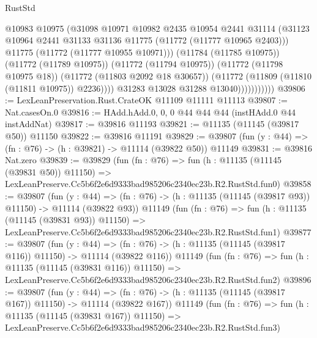 \begin{lexlean}{RustStd}
\begin{coremodule}
                              @10983
                              @10975
                              (@31098
                                @10971
                                @10982
                                @2435
                                @10954
                                @2441
                                @31114
                                (@31123
                                  @10964
                                  @2441
                                  @31133
                                  @31136
                                  @11775
                                  (@11772 (@11777 @10965 @2403)))
                                @11775
                                (@11772 (@11777 @10955 @10971)))
                              (@11784 (@11785 @10975))
                              (@11772 (@11789 @10975))
                              (@11772 (@11794 @10975))
                              (@11772 (@11798 @10975 @18))
                              (@11772 (@11803 @2092 @18 @30657))
                              (@11772 (@11809 (@11810 (@11811 @10975)) @2236))))
                          @31283
                          @13028
                          @31288
                          @13040)))))))))))
@39806 := LexLeanPreservation.Rust.CrateOK @11109 @11111 @11113
@39807 := Nat.casesOn.{0}
@39816 := HAdd.hAdd.{0, 0, 0} @44 @44 @44 (instHAdd.{0} @44 instAddNat)
@39817 := @39816 @11193
@39821 := @11135 (@11145 (@39817 @50)) @11150
@39822 := @39816 @11191
@39829 := @39807 (fun (y : @44) => (fn : @76) -> (h : @39821) -> @11114 (@39822 @50)) @11149
@39831 := @39816 Nat.zero
@39839 := @39829
    (fun (fn : @76) =>
    fun (h : @11135 (@11145 (@39831 @50)) @11150) =>
    LexLeanPreserve.Cc5b6f2e6d9333bad985206c2340ec23b.R2.RustStd.fun0)
@39858 := @39807
    (fun (y : @44) =>
    (fn : @76) -> (h : @11135 (@11145 (@39817 @93)) @11150) -> @11114 (@39822 @93))
    @11149
    (fun (fn : @76) =>
    fun (h : @11135 (@11145 (@39831 @93)) @11150) =>
    LexLeanPreserve.Cc5b6f2e6d9333bad985206c2340ec23b.R2.RustStd.fun1)
@39877 := @39807
    (fun (y : @44) =>
    (fn : @76) -> (h : @11135 (@11145 (@39817 @116)) @11150) -> @11114 (@39822 @116))
    @11149
    (fun (fn : @76) =>
    fun (h : @11135 (@11145 (@39831 @116)) @11150) =>
    LexLeanPreserve.Cc5b6f2e6d9333bad985206c2340ec23b.R2.RustStd.fun2)
@39896 := @39807
    (fun (y : @44) =>
    (fn : @76) -> (h : @11135 (@11145 (@39817 @167)) @11150) -> @11114 (@39822 @167))
    @11149
    (fun (fn : @76) =>
    fun (h : @11135 (@11145 (@39831 @167)) @11150) =>
    LexLeanPreserve.Cc5b6f2e6d9333bad985206c2340ec23b.R2.RustStd.fun3)

\end{coremodule}
\end{lexlean}
